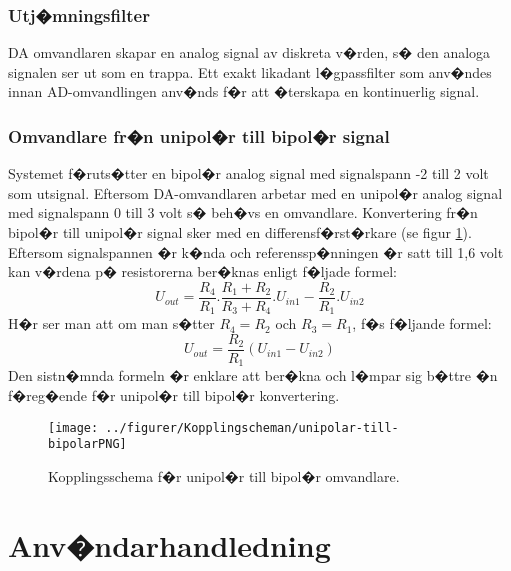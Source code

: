 \documentclass[a4paper]{article}
\begin{document}
\subsubsection{Utj�mningsfilter}
DA omvandlaren skapar en analog signal av diskreta v�rden, s� den analoga signalen ser ut som en trappa. Ett exakt likadant l�gpassfilter som anv�ndes innan AD-omvandlingen anv�nds f�r att �terskapa en kontinuerlig signal.

\subsubsection{Omvandlare fr�n unipol�r till bipol�r signal}

Systemet f�ruts�tter en bipol�r analog signal med signalspann -2 till 2 volt som utsignal. Eftersom DA-omvandlaren arbetar med en unipol�r analog signal med signalspann 0 till 3 volt s� beh�vs en omvandlare. Konvertering fr�n bipol�r till unipol�r signal sker med en differensf�rst�rkare (se figur \ref{fig:unibi}). Eftersom signalspannen �r k�nda och referenssp�nningen �r satt till 1,6 volt kan v�rdena p� resistorerna ber�knas enligt f�ljade formel:
\newline
\[U_{out} = \frac{R_4}{R_1} . \frac{R_1 + R_2}{R_3 + R_4} . U_{in1} - \frac{R_2}{R_1} . U_{in2}\]
\newline
H�r ser man att om man s�tter $R_4 = R_2$ och $R_3 = R_1$, f�s f�ljande formel: 
\newline
\[U_{out} = \frac{R_2}{R_1} (U_{in1} - U_{in2})\]
\newline
Den sistn�mnda formeln �r enklare att ber�kna och l�mpar sig b�ttre �n f�reg�ende f�r unipol�r till bipol�r konvertering. 

\begin{figure}[h!]
  \centering
  \texttt{[image: ../figurer/Kopplingscheman/unipolar-till-bipolarPNG]}
  \caption{Kopplingsschema f�r unipol�r till bipol�r omvandlare.}
  \label{fig:unibi}
\end{figure}

\newpage
\section{Anv�ndarhandledning}
\label{sec:Anv�ndarhandledning}
\end{document}
